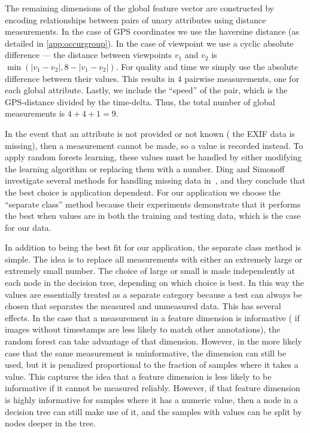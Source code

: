 The remaining dimensions of the global feature vector are constructed by encoding relationships between pairs of
  unary attributes using distance measurements.
In the case of GPS coordinates we use the haversine distance (as detailed in \cref{app:occurgroup}).
In the case of viewpoint we use a cyclic absolute difference --- \ie{} the distance between viewpoints $v_1$ and
  $v_2$ is $\min(|v_1 - v_2|, 8 - |v_1 - v_2|)$.
For quality and time we simply use the absolute difference between their values.
This results in $4$ pairwise measurements, one for each global attribute.
Lastly, we include the ``speed'' of the pair, which is the GPS-distance divided by the time-delta.
Thus, the total number of global measurements is $4 + 4 + 1 = 9$.

In the event that an attribute is not provided or not known (\eg{} the EXIF data is missing), then a measurement
  cannot be made, so a \nan{} value is recorded instead.
To apply random forests learning, these \nan{} values must be handled by either modifying the learning algorithm
  or replacing them with a number.
Ding and Simonoff investigate several methods for handling missing data in~\cite{ding_investigation_2010}, and
  they conclude that the best choice is application dependent.
For our application we choose the ``separate class'' method because their experiments demonstrate that it
  performs the best when \nan{} values are in both the training and testing data, which is the case for our data.

In addition to being the best fit for our application, the separate class method is simple.
The idea is to replace all \nan{} measurements with either an extremely large or extremely small number.
The choice of large or small is made independently at each node in the decision tree, depending on which choice
  is best.
In this way the \nan{} values are essentially treated as a separate category because a test can always be chosen
  that separates the measured and unmeasured data.
This has several effects.
In the case that a \nan{} measurement in a feature dimension is informative (\eg{} if images without timestamps
  are less likely to match other annotations), the random forest can take advantage of that dimension.
However, in the more likely case that the same \nan{} measurement is uninformative, the dimension can still be
  used, but it is penalized proportional to the fraction of samples where it takes a \nan{} value.
This captures the idea that a feature dimension is less likely to be informative if it cannot be measured
  reliably.
However, if that feature dimension is highly informative for samples where it has a numeric value, then a node in
  a decision tree can still make use of it, and the samples with \nan{} values can be split by nodes deeper in the
  tree.


